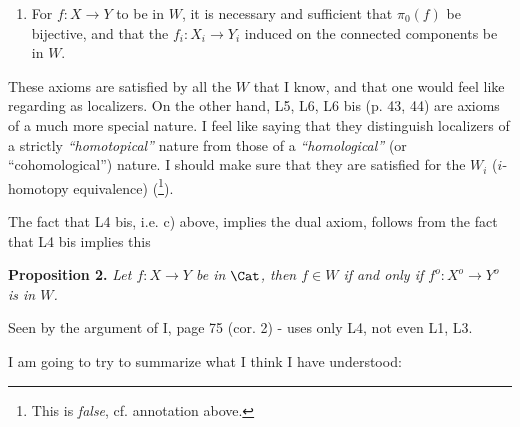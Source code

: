 
\begin{enumerate}[leftmargin=*]
\item[d)] For $f : X \longrightarrow Y$ to be in $W$, it is necessary and sufficient that $\pi_0(f)$ be bijective, and that the $f_i : X_i \longrightarrow Y_i$ induced on the connected components be in $W$.
\end{enumerate}

These axioms are satisfied by all the $W$ that I know, and that one would feel like regarding as localizers. On the other hand, L5, L6, L6 bis (p. 43, 44) are axioms of a much more special nature. I feel like saying that they distinguish localizers of a strictly \textit{``homotopical''} nature from those of a \textit{``homological''} (or ``cohomological'') nature. I should make sure that they are satisfied for the $W_i$ ($i$-homotopy equivalence) (\footnote[32]{This is \textit{false}, cf. annotation above.}). %

The fact that L4 bis, i.e. c) above, implies the dual axiom, follows from the fact that L4 bis implies this

\textbf{Proposition 2.} \textit{Let $f : X \longrightarrow Y$ be in} $\Cat$\textit{, then $f \in W$ if and only if $f^o : X^o \longrightarrow Y^o$ is in $W$.}

Seen by the argument of I, page 75 (cor. 2) - uses only L4, not even L1, L3.


I am going to try to summarize what I think I have understood:

